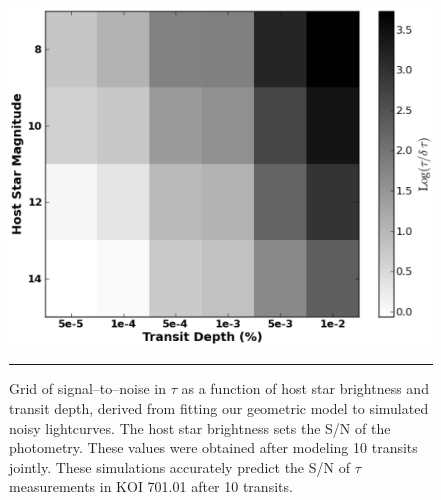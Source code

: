 \begin{figure}[t] 
  \begin{minipage}[c]{0.47\textwidth}
    \includegraphics[width=\textwidth]{figures/delta_tau.eps}
  \end{minipage}\hfill
  \begin{minipage}[c]{0.5\textwidth}
    \caption{Grid of signal--to--noise in $\tau$ as a function of host
    star brightness and transit depth, derived from fitting our
    geometric model to simulated noisy lightcurves.  The host star
    brightness sets the S/N of the photometry.  These
    values were obtained after modeling 10 transits jointly.  These
    simulations accurately predict the S/N of $\tau$ measurements in
    KOI 701.01 after 10 transits.}
    \label{fig-dtau}
    \hspace*{\fill}  
    \hrule
  \end{minipage}
\end{figure}


